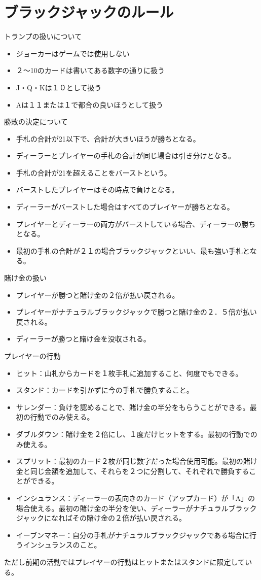 \section{ブラックジャックのルール}
トランプの扱いについて
\begin{itemize}
\item ジョーカーはゲームでは使用しない
\item ２～10のカードは書いてある数字の通りに扱う
\item J・Q・Kは１０として扱う
\item Aは１１または１で都合の良いほうとして扱う
\end{itemize}
勝敗の決定について
\begin{itemize}
\item 手札の合計が21以下で、合計が大きいほうが勝ちとなる。
\item ディーラーとプレイヤーの手札の合計が同じ場合は引き分けとなる。
\item 手札の合計が21を超えることをバーストという。
\item バーストしたプレイヤーはその時点で負けとなる。
\item ディーラーがバーストした場合はすべてのプレイヤーが勝ちとなる。
\item プレイヤーとディーラーの両方がバーストしている場合、ディーラーの勝ちとなる。
\item 最初の手札の合計が２１の場合ブラックジャックといい、最も強い手札となる。
\end{itemize}
賭け金の扱い
\begin{itemize}
\item プレイヤーが勝つと賭け金の２倍が払い戻される。
\item プレイヤーがナチュラルブラックジャックで勝つと賭け金の２．５倍が払い戻される。
\item ディーラーが勝つと賭け金を没収される。
\end{itemize}
プレイヤーの行動
\begin{itemize}
\item ヒット：山札からカードを１枚手札に追加すること、何度でもできる。
\item スタンド：カードを引かずに今の手札で勝負すること。
\item サレンダー：負けを認めることで、賭け金の半分をもらうことができる。最初の行動でのみ使える。
\item ダブルダウン：賭け金を２倍にし、１度だけヒットをする。最初の行動でのみ使える。
\item スプリット：最初のカード２枚が同じ数字だった場合使用可能。最初の賭け金と同じ金額を追加して、それらを２つに分割して、それぞれで勝負することができる。
\item インシュランス：ディーラーの表向きのカード（アップカード）が「A」の場合使える。最初の賭け金の半分を使い、ディーラーがナチュラルブラックジャックになればその賭け金の２倍が払い戻される。
\item イーブンマネー：自分の手札がナチュラルブラックジャックである場合に行うインシュランスのこと。
\end{itemize}
ただし前期の活動ではプレイヤーの行動はヒットまたはスタンドに限定している。

